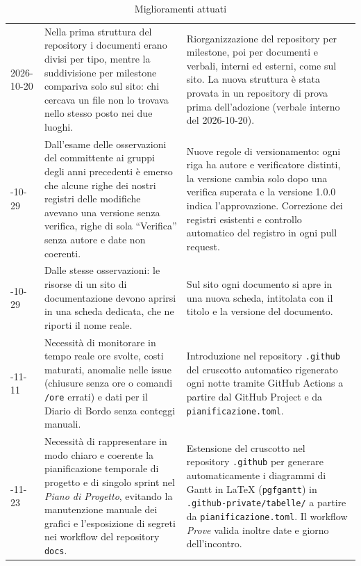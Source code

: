 \documentclass[documento]{gpt}
\begin{document}
	\begin{table}[H]
		\centering
		\small
		\caption{Miglioramenti attuati\label{tab:miglioramenti}}
		\begin{tabularx}{\textwidth}{@{}p{1.9cm}XX@{}}
			\toprule
			\intestazione{Data} & \intestazione{Criticità rilevata} &
			\intestazione{Azione intrapresa} \\
			\midrule
			2026-10-20 &
			Nella prima struttura del repository i documenti erano divisi per
			tipo, mentre la suddivisione per milestone compariva solo sul sito:
			chi cercava un file non lo trovava nello stesso posto nei due luoghi. &
			Riorganizzazione del repository per milestone, poi per documenti e
			verbali, interni ed esterni, come sul sito. La nuova struttura è stata
			provata in un repository di prova prima dell'adozione (verbale
			interno del 2026-10-20). \\
			\addlinespace
			2026-10-29 &
			Dall'esame delle osservazioni del committente ai gruppi degli anni
			precedenti è emerso che alcune righe dei nostri registri delle
			modifiche avevano una versione senza verifica, righe di sola
			``Verifica'' senza autore e date non coerenti. &
			Nuove regole di versionamento: ogni riga ha autore e verificatore
			distinti, la versione cambia solo dopo una verifica superata e la
			versione 1.0.0 indica l'approvazione. Correzione dei registri esistenti
			e controllo automatico del registro in ogni pull request. \\
			\addlinespace
			2026-10-29 &
			Dalle stesse osservazioni: le risorse di un sito di documentazione
			devono aprirsi in una scheda dedicata, che ne riporti il nome reale. &
			Sul sito ogni documento si apre in una nuova scheda, intitolata con il
			titolo e la versione del documento. \\
			\addlinespace
			2026-11-11 &
			Necessità di monitorare in tempo reale ore svolte, costi maturati,
			anomalie nelle issue (chiusure senza ore o comandi \texttt{/ore} errati)
			e dati per il Diario di Bordo senza conteggi manuali. &
			Introduzione nel repository \texttt{.github} del cruscotto automatico
			rigenerato ogni notte tramite GitHub Actions a partire dal GitHub Project
			e da \texttt{pianificazione.toml}.\\
			\addlinespace
			2026-11-23 &
			Necessità di rappresentare in modo chiaro e coerente la pianificazione
			temporale di progetto e di singolo sprint nel \textit{Piano di Progetto},
			evitando la manutenzione manuale dei grafici e l'esposizione di segreti
			nei workflow del repository \texttt{docs}. &
			Estensione del cruscotto nel repository \texttt{.github} per generare
			automaticamente i diagrammi di Gantt in \LaTeX{} (\texttt{pgfgantt})
			in \texttt{.github-private/tabelle/} a partire da \texttt{pianificazione.toml}.
			Il workflow \textit{Prove} valida inoltre date e giorno dell'incontro.\\
			\bottomrule
		\end{tabularx}
		
	\end{table}
	
\end{document}
